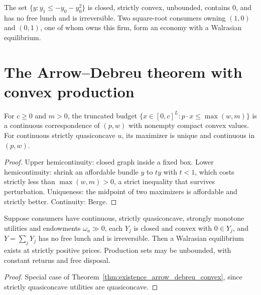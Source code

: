 \begin{theorem}
\label{thm:parabola_economy}
\leanok
{}
The set $\{y : y_1 \le -y_0 - y_0^2\}$ is closed, strictly convex, unbounded, contains $0$, and has no free lunch and is
irreversible. Two square-root consumers owning $(1,0)$ and $(0,1)$, one of whom owns this firm, form an economy with a
Walrasian equilibrium.
\end{theorem}

\section{The Arrow--Debreu theorem with convex production}
\label{sec:existence_arrow_debreu}

\begin{lemma}
\label{lem:trunc_demand}
\leanok
For $c \ge 0$ and $m > 0$, the truncated budget $\{x \in [0,c]^L : p \cdot x \le \max(w, m)\}$ is a continuous
correspondence of $(p, w)$ with nonempty compact convex values. For continuous strictly quasiconcave $u$, its maximizer
is unique and continuous in $(p, w)$.
\end{lemma}
\begin{proof}
\leanok
Upper hemicontinuity: closed graph inside a fixed box. Lower hemicontinuity: shrink an affordable bundle $y$ to $ty$ with
$t < 1$, which costs strictly less than $\max(w, m) > 0$, a strict inequality that survives perturbation. Uniqueness:
the midpoint of two maximizers is affordable and strictly better. Continuity: Berge.
\end{proof}

\begin{theorem}
\label{thm:existence_arrow_debreu}
\leanok
{}
Suppose consumers have continuous, strictly quasiconcave, strongly monotone utilities and endowments $\omega_a \gg 0$, each
$Y_j$ is closed and convex with $0 \in Y_j$, and $Y = \sum_j Y_j$ has no free lunch and is irreversible. Then a Walrasian
equilibrium exists at strictly positive prices. Production sets may be unbounded, with constant returns and free
disposal.
\end{theorem}
\begin{proof}
\leanok
Special case of Theorem~\ref{thm:existence_arrow_debreu_convex}, since strictly quasiconcave utilities are quasiconcave.
\end{proof}

